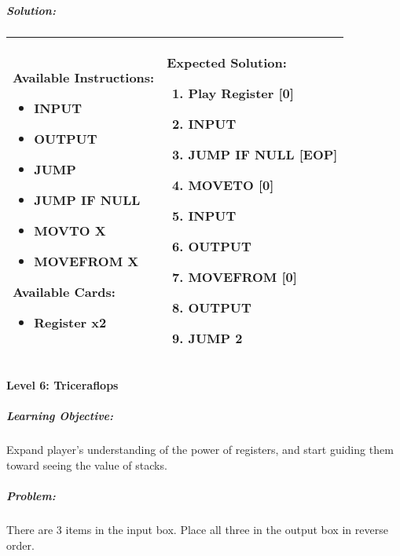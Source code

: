 \subparagraph{Solution:} 
\begin{center}
    \begin{tabular}{ | m{5cm} | m{9cm} | } 
        \hline
            \textbf{Available Instructions:} 
            \begin{itemize}
                \setlength\itemsep{-.35em}
                \item INPUT
                \item OUTPUT
                \item JUMP
                \item JUMP IF NULL
                \item MOVTO X
                \item MOVEFROM X
            \end{itemize}
            \textbf{Available Cards:} 
            \begin{itemize}
                \setlength\itemsep{-.35em}
                \item Register x2
            \end{itemize}& 
            \textbf{Expected Solution:} 
            \begin{enumerate}
                \setlength\itemsep{-.35em}
                \item Play Register [0]
                \item INPUT
                \item JUMP IF NULL [EOP]
                \item MOVETO [0]
                \item INPUT
                \item OUTPUT
                \item MOVEFROM [0] 
                \item OUTPUT
                \item JUMP 2
            \end{enumerate}
            \\
        \hline
    \end{tabular}
\end{center}

\paragraph{Level 6: Triceraflops}
\subparagraph{Learning Objective:} Expand player's understanding of the power of registers, and start guiding them toward seeing the value of stacks.

\subparagraph{Problem:} There are 3 items in the input box. Place all three in the output box in reverse order.

